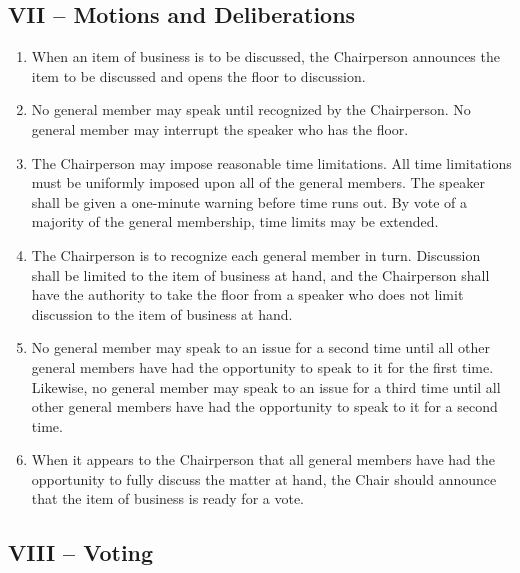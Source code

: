 \documentclass[12pt,a4paper]{article}
\begin{document}
\subsection*{VII – Motions and Deliberations}

\begin{enumerate}
\item When an item of business is to be discussed, the Chairperson announces the item to be discussed and opens the floor to discussion.

\item No general member may speak until recognized by the Chairperson. No general member may interrupt the speaker who has the floor.

\item The Chairperson may impose reasonable time limitations. All time limitations must be uniformly imposed upon all of the general members. The speaker shall be given a one-minute warning before time runs out. By vote of a majority of the general membership, time limits may be extended.

\item The Chairperson is to recognize each general member in turn. Discussion shall be limited to the item of business at hand, and the Chairperson shall have the authority to take the floor from a speaker who does not limit discussion to the item of business at hand.

\item No general member may speak to an issue for a second time until all other general members have had the opportunity to speak to it for the first time. Likewise, no general member may speak to an issue for a third time until all other general members have had the opportunity to speak to it for a second time.

\item When it appears to the Chairperson that all general members have had the opportunity to fully discuss the matter at hand, the Chair should announce that the item of business is ready for a vote.
\end{enumerate}

\subsection*{VIII – Voting}
\end{document}

